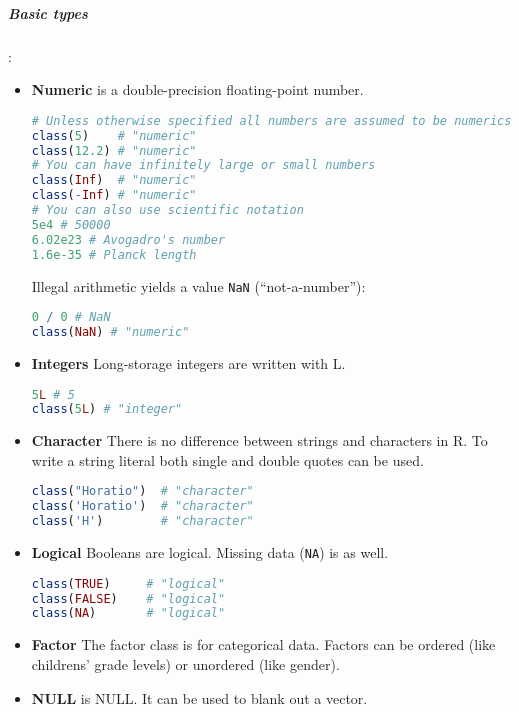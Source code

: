 \subparagraph{Basic types}:
\begin{itemize}
\item \textbf{Numeric} is a double-precision floating-point number.
\begin{lstlisting}[language={r}, style=snippet]
# Unless otherwise specified all numbers are assumed to be numerics
class(5)    # "numeric"
class(12.2) # "numeric"
# You can have infinitely large or small numbers
class(Inf)  # "numeric"
class(-Inf) # "numeric"
# You can also use scientific notation
5e4 # 50000
6.02e23 # Avogadro's number
1.6e-35 # Planck length
\end{lstlisting}
Illegal arithmetic yields a value \texttt{NaN} (``not-a-number''):
\begin{lstlisting}[language={r}, style=snippet]
0 / 0 # NaN
class(NaN) # "numeric"
\end{lstlisting}
\item\textbf{Integers} Long-storage integers are written with L.
\begin{lstlisting}[language={r}, style=snippet]
5L # 5
class(5L) # "integer"
\end{lstlisting}
\item \textbf{Character} There is no difference between strings and characters in R. To write a string literal both single and double quotes can be used.
\begin{lstlisting}[language={r}, style=snippet]
class("Horatio")  # "character"
class('Horatio')  # "character"
class('H')        # "character"
\end{lstlisting}
\item \textbf{Logical} Booleans are logical. Missing data (\texttt{NA}) is as well.
\begin{lstlisting}[language={r}, style=snippet]
class(TRUE)     # "logical"
class(FALSE)    # "logical"
class(NA)       # "logical"
\end{lstlisting}
\item \textbf{Factor} The factor class is for categorical data. Factors can be ordered (like childrens' grade levels) or unordered (like gender).
\item \textbf{NULL} is NULL. It can be used to blank out a vector.
\end{itemize}

